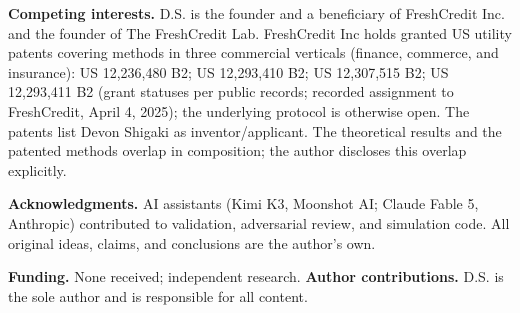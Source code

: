 \documentclass[11pt,twocolumn]{article}
\theoremstyle{plain}
\begin{document}
\textbf{Competing interests.} D.S. is the founder and a beneficiary of FreshCredit Inc. and the founder of The FreshCredit Lab. FreshCredit Inc holds granted US utility patents covering methods in three commercial verticals (finance, commerce, and insurance): US 12,236,480 B2; US 12,293,410 B2; US 12,307,515 B2; US 12,293,411 B2 (grant statuses per public records; recorded assignment to FreshCredit, April 4, 2025); the underlying protocol is otherwise open. The patents list Devon Shigaki as inventor/applicant. The theoretical results and the patented methods overlap in composition; the author discloses this overlap explicitly.

\textbf{Acknowledgments.} AI assistants (Kimi K3, Moonshot AI; Claude Fable 5, Anthropic) contributed to validation, adversarial review, and simulation code. All original ideas, claims, and conclusions are the author's own.

\textbf{Funding.} None received; independent research. \textbf{Author contributions.} D.S. is the sole author and is responsible for all content.



\end{document}
